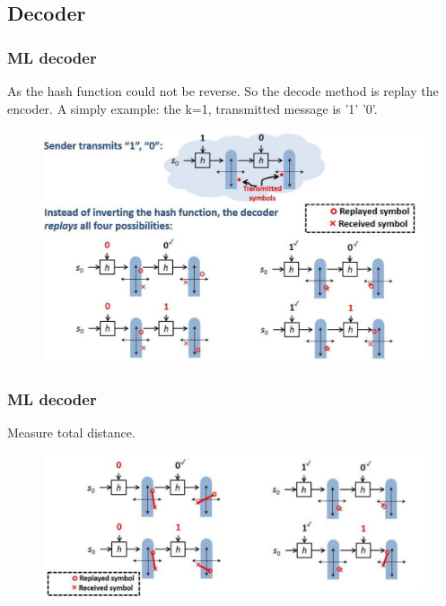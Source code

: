 \documentclass{beamer}
\begin{document}
\subsection{Decoder}

\begin{frame}
\frametitle{ML decoder}
{\small As the hash function could not be reverse. So the decode method is replay the encoder. A simply example: the k=1, transmitted message is '1' '0'.}
\begin{figure}
\includegraphics[width=.8\textwidth]{Spinaldecode1.pdf}
\end{figure}
\end{frame}
\begin{frame}
\frametitle{ML decoder}
Measure total distance.
\begin{figure}
\includegraphics[width=.99\textwidth]{Spinaldecode2.pdf}
\end{figure}
\end{frame}
\end{document}
